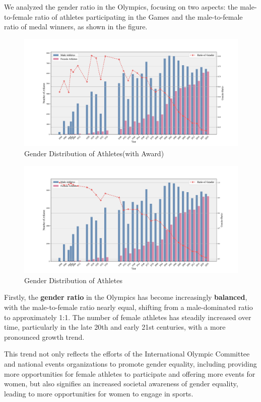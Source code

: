 \documentclass[12pt]{article}  %
\begin{document}
We analyzed the gender ratio in the Olympics, focusing on two aspects: the male-to-female ratio of athletes participating in the Games and the male-to-female ratio of medal winners, as shown in the figure.

	\begin{figure}[H]
		\centering
		\includegraphics[width=12cm]{img/Gender with Award.png}
		\caption{Gender Distribution of Athletes(with Award)}
		\label{fig:aa}
	\end{figure}
	
	\begin{figure}[H]
		\centering
		\includegraphics[width=12cm]{img/Gender.png}
		\caption{Gender Distribution of Athletes}
		\label{fig:aa}
	\end{figure}
	
Firstly, the \textbf{gender ratio} in the Olympics has become increasingly \textbf{balanced}, with the male-to-female ratio nearly equal, shifting from a male-dominated ratio to approximately 1:1. The number of female athletes has steadily increased over time, particularly in the late 20th and early 21st centuries, with a more pronounced growth trend.

This trend not only reflects the efforts of the International Olympic Committee and national events organizations to promote gender equality, including providing more opportunities for female athletes to participate and offering more events for women, but also signifies an increased societal awareness of gender equality, leading to more opportunities for women to engage in sports.
\end{document}
